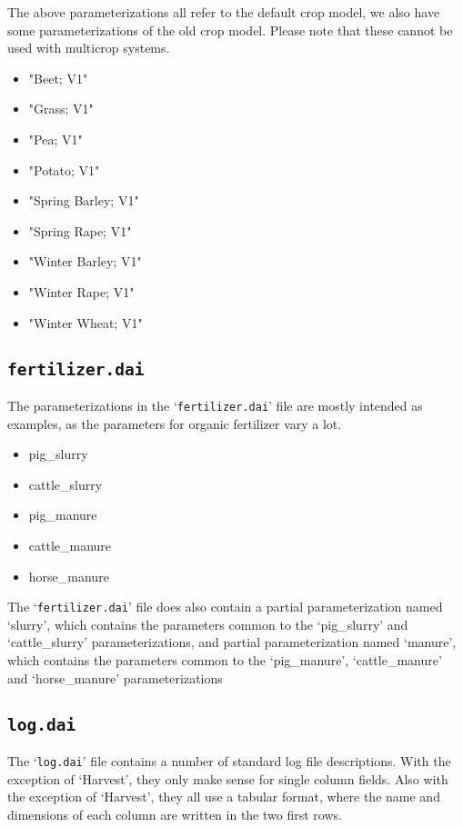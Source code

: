 The above parameterizations all refer to the default crop model, we
also have some parameterizations of the old crop model.  Please note
that these cannot be used with multicrop systems.

\begin{itemize}
\item "Beet; V1"
\item "Grass; V1"
\item "Pea; V1"
\item "Potato; V1"
\item "Spring Barley; V1"
\item "Spring Rape; V1"
\item "Winter Barley; V1"
\item "Winter Rape; V1"
\item "Winter Wheat; V1"
\end{itemize}

\subsection{\texttt{fertilizer.dai}}

The parameterizations in the `\texttt{fertilizer.dai}' file are mostly
intended as examples, as the parameters for organic fertilizer vary
a lot.  
\begin{itemize}
\item pig\_slurry
\item cattle\_slurry
\item pig\_manure
\item cattle\_manure
\item horse\_manure
\end{itemize}
The `\texttt{fertilizer.dai}' file does also contain a partial
parameterization named `slurry', which contains the parameters common
to the `pig\_slurry' and `cattle\_slurry' parameterizations, and
partial parameterization named `manure', which contains the parameters
common to the `pig\_manure', `cattle\_manure' and `horse\_manure'
parameterizations

\subsection{\texttt{log.dai}}

The `\texttt{log.dai}' file contains a number of standard log file
descriptions.  With the exception of `Harvest', they only make sense
for single column fields.  Also with the exception of `Harvest', they
all use a tabular format, where the name and dimensions of each column
are written in the two first rows.


